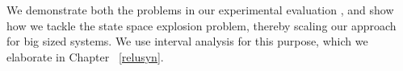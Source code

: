 We demonstrate both the problems in our experimental evaluation , 
and show how we tackle the state space explosion problem, thereby scaling our approach for big sized systems. 
We use interval analysis for this purpose, which we elaborate in Chapter ~\ref{relusyn}. 


















